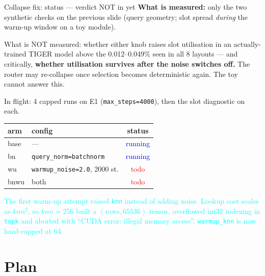 \documentclass{beamer}
\newcommand{\pierre}[1]{\textcolor{cyan}{#1}}
\newcommand{\strun}{\textcolor{blue}{running}}
\newcommand{\sttodo}{\textcolor{red}{todo}}
\begin{document}
\begin{frame}{Collapse fix: status --- \alert{verdict NOT in yet}}
\textbf{What is measured:} only the two synthetic checks on the previous slide
(query geometry; slot spread \emph{during} the warm-up window on a toy module).

\medskip
\alert{What is NOT measured:} whether either knob raises slot utilisation in an
actually-trained TIGER model above the 0.012--0.049\% seen in all 8 layouts ---
and critically, \textbf{whether utilisation survives after the noise switches
off.} The router may re-collapse once selection becomes deterministic again. The
toy cannot answer this.

\medskip
In flight: 4 capped runs on E1 (\texttt{max\_steps=4000}), then the slot
diagnostic on each.
\begin{center}
\begin{tabular}{|l|l|c|}
\hline
arm & config & status \\
\hline
base  & ---                                 & \strun \\
bn    & \texttt{query\_norm=batchnorm}       & \strun \\
wu    & \texttt{warmup\_noise=2.0}, 2000 st. & \sttodo \\
bnwu  & both                                 & \sttodo \\
\hline
\end{tabular}
\end{center}

\medskip
\pierre{The first warm-up attempt raised \texttt{knn} instead of adding noise.
Lookup cost scales as $knn^2$, so $knn{=}256$ built a $(\text{rows},65536)$
tensor, overflowed int32 indexing in \texttt{topk} and aborted with ``CUDA error:
illegal memory access''. \texttt{warmup\_knn} is now hard-capped at 64.}
\end{frame}

\section{Plan}
\end{document}
